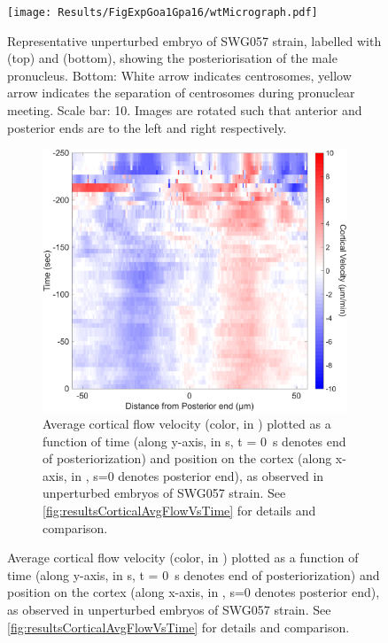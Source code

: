 \begin{figure}
\centering
\texttt{[image: Results/FigExpGoa1Gpa16/wtMicrograph.pdf]}
\caption[Representative micrograph: unperturbed embryos of SWG057 strain]{Representative unperturbed embryo of SWG057 strain, labelled with  (top) and  (bottom), showing the posteriorisation of the male pronucleus. Bottom: White arrow indicates centrosomes, yellow arrow indicates the separation of centrosomes during pronuclear meeting. Scale bar: \SI{10}{\unitLength}. Images are rotated such that anterior and posterior ends are to the left and right respectively.}
\label{fig:swg057WtMicrograph}
\end{figure}

\begin{figure}
\centering
\begin{subfigure}[t]{0.45\textwidth}
    \centering
    \includegraphics[width=\textwidth]{Results/FigExpGoa1Gpa16/wt_corticalflow_timeFig.pdf}
    \caption{Average cortical flow velocity (color, in \si{\unitCrtxVel}) plotted as a function of time (along y-axis, in \si{\second}, t = \SI{0}{\second} denotes end of posteriorization) and position on the cortex (along x-axis, in \si{\unitLength}, s=\SI{0}{\unitLength} denotes posterior end), as observed in unperturbed embryos of SWG057 strain. See \autoref{fig:resultsCorticalAvgFlowVsTime} for details and comparison.} 
    \label{subfig:swg057WtCrtxFlow-VsTime}
\end{subfigure}

\end{figure}
